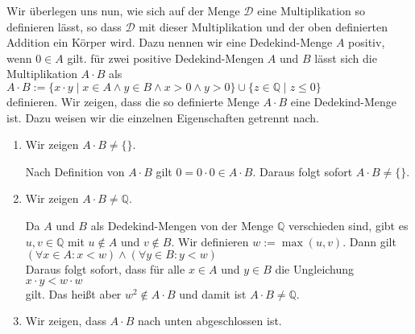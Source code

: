 Wir überlegen uns nun, wie sich auf der Menge $\mathcal{D}$ eine Multiplikation so definieren lässt,
so dass $\mathcal{D}$ mit dieser Multiplikation und der oben definierten Addition ein Körper wird.
Dazu nennen wir eine Dedekind-Menge $A$ positiv, wenn $0 \in A$ gilt.  für zwei positive Dedekind-Mengen $A$
und $B$ lässt sich die Multiplikation $A \cdot B$ als
\\[0.2cm]
\hspace*{1.3cm}
$A \cdot B := \{ x \cdot y \mid x \in A \wedge y \in B \wedge x > 0 \wedge y > 0 \} \cup 
              \{ z \in \mathbb{Q} \mid z \leq 0 \}$
\\[0.2cm]
definieren.  Wir zeigen, dass die so definierte Menge $A \cdot B$ eine Dedekind-Menge ist.
Dazu weisen wir die einzelnen Eigenschaften getrennt nach.
\begin{enumerate}
\item Wir zeigen $A \cdot B \not= \{\}$.

      Nach Definition von $A \cdot B$ gilt $0 = 0 \cdot 0 \in A \cdot B$.   Daraus folgt sofort $A \cdot B \not= \{\}$.
\item Wir zeigen $A \cdot B \not= \mathbb{Q}$.

      Da $A$ und $B$ als Dedekind-Mengen von der Menge $\mathbb{Q}$ verschieden sind, gibt es 
      $u,v \in \mathbb{Q}$ mit $u \not\in A$ und $v \not\in B$. Wir definieren $w := \max(u, v)$.  Dann gilt 
      \\[0.2cm]
      \hspace*{1.3cm}
      $(\forall x \in A: x < w) \wedge (\forall y \in B: y < w)$
      \\[0.2cm]
      Daraus folgt sofort, dass für alle $x \in A$ und $y \in B$ die Ungleichung
      \\[0.2cm]
      \hspace*{1.3cm}
      $x \cdot y < w \cdot w$
      \\[0.2cm]
      gilt.  Das heißt aber $w^2 \not\in A \cdot B$ und damit ist $A \cdot B \not= \mathbb{Q}$.
\item Wir zeigen, dass $A \cdot B$ nach unten abgeschlossen ist.


\end{enumerate}
